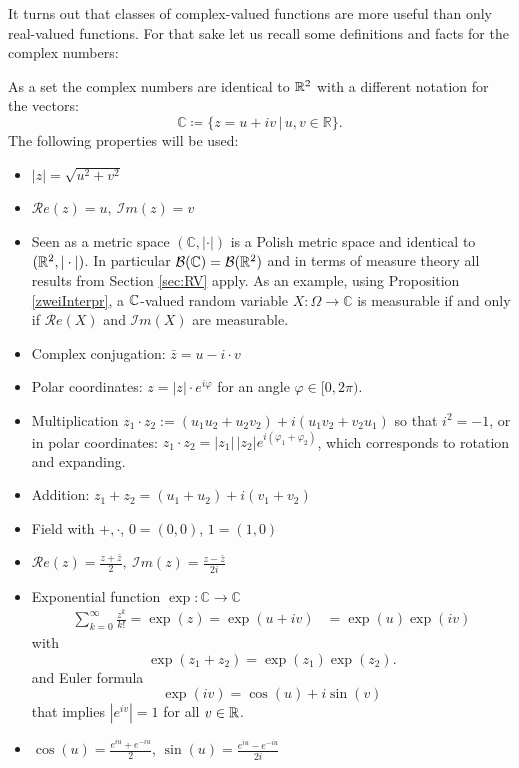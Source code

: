 It turns out that classes of complex-valued functions are more useful than only real-valued functions. For that sake let us recall some definitions and facts for the complex numbers:
\begin{lstep}
  As a set the complex numbers are identical to $\mathbb{R}^2$ with a different notation for the vectors: $$\mathbb{C}\coloneqq \{ z = u+iv \,|\, u,v\in\mathbb{R} \}.$$ The following properties will be used:
	\begin{itemize}
		\item $\lvert z \rvert = \sqrt{u^2 + v^2}$
		\item $\mathcal{R}e(z) = u, \: \mathcal{I}m(z) = v$
		\item Seen as a metric space $( \mathbb{C}, |\cdot| )$ is a Polish metric space and identical to $(\mathbb{R}^2,|\cdot|)$. In particular $\mathcal B(\mathbb{C})=\mathcal B(\mathbb{R}^2)$ and in terms of measure theory all results from Section \ref{sec:RV} apply. As an example, using Proposition \ref{zweiInterpr}, a $\mathbb{C}$-valued random variable $X\colon \Omega \to \mathbb{C}$ is measurable if and only if $\mathcal{R}e(X)$ and $\mathcal{I}m(X)$ are measurable.
				\item Complex conjugation: $\bar{z} = u - i \cdot v$
		\item Polar coordinates: $z = \lvert z \rvert \cdot e^{i \varphi}$ for an angle $\varphi\in [0,2\pi)$.
		\item Multiplication $z_1\cdot z_2:= (u_1u_2+u_2v_2)+i(u_1v_2+v_2u_1)$ so that $i^2=-1$, or in polar coordinates: $z_1 \cdot z_2 = \lvert z_1 \rvert \, \lvert z_2 \rvert e^{i(\varphi_1 + \varphi_2)}$, which corresponds to rotation and expanding.
		\item Addition: $z_1 + z_2 = (u_1+u_2)+i(v_1+v_2)$
		\item Field with $+,\cdot$, $0=(0,0)$, $1=(1,0)$
		\item $\mathcal{R}e(z) = \frac{z+ \bar{z}}{2},\: \mathcal{I}m(z) = \frac{z-\bar{z}}{2i}$
		\item Exponential function $\exp\colon \mathbb{C} \to \mathbb{C}$ 
			\begin{align*}
				\sum_{k=0}^{\infty} \frac{z^k}{k!}=\exp(z) = \exp(u+iv) &= \exp(u)\exp(iv)
			\end{align*}
			with
			$$\exp(z_1 + z_2) = \exp(z_1)\exp(z_2).$$
			and Euler formula
			$$\exp(iv)=\cos(u)+i \sin(v)$$
			that implies $|e^{iv}|=1$ for all $v\in\mathbb{R}$.
		\item $\cos(u) = \frac{e^{iu}+ e^{-iu}}{2}$, $\sin(u) =  \frac{e^{iu} - e^{-iu}}{2i}$
	\end{itemize}
\end{lstep}
